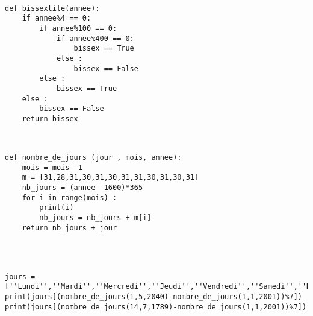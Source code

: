\ifprof
\begin{corrige}~\\ \vspace{-.5cm}
\begin{lstlisting}
def bissextile(annee):
    if annee%4 == 0:
        if annee%100 == 0:
            if annee%400 == 0:
                bissex == True 
            else :
                bissex == False
        else :
            bissex == True 
    else : 
        bissex == False
    return bissex
\end{lstlisting}
\end{corrige}
\else
\fi



\ifprof
\begin{corrige}~\\ \vspace{-.5cm}
\begin{lstlisting}
def nombre_de_jours (jour , mois, annee):
    mois = mois -1 
    m = [31,28,31,30,31,30,31,31,30,31,30,31]
    nb_jours = (annee- 1600)*365
    for i in range(mois) :
        print(i)
        nb_jours = nb_jours + m[i]
    return nb_jours + jour
    
\end{lstlisting}
\end{corrige}
\else
\fi




\ifprof
\begin{corrige}~\\ \vspace{-.5cm}
\begin{lstlisting}
jours = [''Lundi'',''Mardi'',''Mercredi'',''Jeudi'',''Vendredi'',''Samedi'',''Dimanche'']
print(jours[(nombre_de_jours(1,5,2040)-nombre_de_jours(1,1,2001))%7])
print(jours[(nombre_de_jours(14,7,1789)-nombre_de_jours(1,1,2001))%7])
\end{lstlisting}
\end{corrige}
\else
\fi